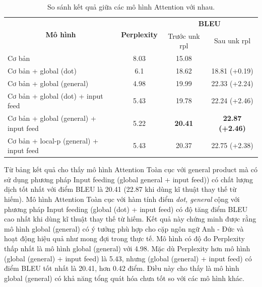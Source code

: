 

\begin{table}
	\centering
	\begin{tabular}{|l|c|c|c|} 
		\hline
		\multicolumn{1}{|c|}{\multirow{2}{*}{ \textbf{Mô hình} }} & \multirow{2}{*}{\textbf{Perplexity } } & \multicolumn{2}{c|}{\textbf{BLEU } }      \\ 
		\cline{3-4}
		\multicolumn{1}{|c|}{}                                    &                                        & Trước unk rpl   & Sau unk rpl             \\ 
		\hline
		Cơ bản                                                    & 8.03                                   & 15.08           &                         \\ 
		\hline
		Cơ bản + global (dot)                                     & 6.1                                    & 18.62           & 18.81 (+0.19)           \\ 
		\hline
		Cơ bản + global (general)                                 & 4.98                                   & 19.99           & 22.33 (+2.24)           \\ 
		\hline
		Cơ bản + global (dot) + input feed                        & 5.43                                   & 19.78           & 22.24 (+2.46)           \\ 
		\hline
		Cơ bản + global (general) + input feed                    & 5.22                                   & \textbf{20.41}  & \textbf{22.87 (+2.46)}  \\ 
		\hline
		Cơ bản + local-p (general) + input feed                   & 5.43                                   & 20.37           & 22.75 (+2.38)           \\
		\hline
	\end{tabular}
	\caption{So sánh kết quả giữa các mô hình Attention với nhau.}
	\label{tab_attn-vs-attn}
\end{table}

Từ bảng kết quả cho thấy mô hình Attention Toàn cục với general product mà có sử dụng phương pháp Input feeding (global general + input feed)) có chất lượng dịch tốt nhất với điểm BLEU là 20.41 (22.87 khi dùng kĩ thuật thay thế từ hiếm). Mô hình Attention Toàn cục với hàm tính điểm \textit{dot, general} cộng với phương pháp Input feeding (global (dot) + input feed) có độ tăng điểm BLEU cao nhất khi dùng kĩ thuật thay thế từ hiếm. Kết quả này chứng minh được rằng mô hình global (general) có ý tưởng phù hợp cho cặp ngôn ngữ Anh - Đức và hoạt động hiệu quả như mong đợi trong thực tế.  Mô hình có độ đo Perplexity thấp nhất là mô hình global (general) với 4.98. Mặc dù Perplexity hơn mô hình (global (general) + input feed) là 5.43, nhưng (global (general) + input feed) có điểm BLEU tốt nhất là 20.41, hơn 0.42 điểm. Điều này cho thấy là mô hình global (general) có khả năng tổng quát hóa chưa tốt so với các mô hình khác.
 
